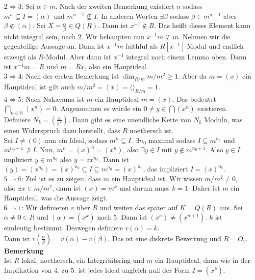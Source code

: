 \documentclass[a4paper, 12pt]{article}
\begin{document}
$2 \Rightarrow 3$: Sei $\alpha \in m$. Nach der zweiten Bemerkung existiert $n$ sodass $m^n \subseteq I = (\alpha)$ und $m^{n-1} \not \subseteq I$. In anderen Worten $\exists \beta$ sodass $\beta \in m^{n-1}$ aber $\beta \notin (\alpha)$. Sei $X = \frac{\alpha}{\beta} \in Q(R)$. Dann ist $x^{-1} \notin R$. Das heißt dieses Element kann nicht integral sein, nach 2. Wir behaupten nun $x^{-1}m \not \subseteq m$. Nehmen wir die gegenteilige Aussage an. Dann ist $x^{-1}m$ faithful als $R[x^{-1}]$-Modul und endlich erzeugt als $R$-Modul. Aber dann ist $x^{-1}$ integral nach einem Lemma oben. Dann ist $x^{-1}m = R$ und $m = Rx$, also ein Hauptideal.\\
$3 \Rightarrow 4$: Nach der ersten Bemerkung ist $\dim_{R/m} m/m^2 \geq 1$. Aber da $m = (x)$ ein Hauptideal ist gilt auch $m/m^2 = (\overline{x}) = \langle \overline \rangle_{R/m} = 1$.\\
$4 \Rightarrow 5$: Nach Nakayama ist $m$ ein Hauptideal $m = (x)$. Das bedeutet $\bigcap_{n \in \mathbb{N}} (x^n) = 0$. Angenommen es würde ein $0 \neq y \in \bigcap (x^n)$ existieren. Definiere $N_k = (\frac{y}{x^k})$. Dann gibt es eine unendliche Kette von $N_k$ Moduln, was einen Widerspruch dazu herstellt, dass $R$ noethersch ist.\\
Sei $I \neq (0)$ nun ein Ideal, sodass $m^n \subseteq I$. $\exists n_0$ maximal sodass $I \subseteq m^{n_0}$ und $m^{n_0+1} \not \supseteq I$. Nun, $m^n = (x)^n = (x^n)$, also $\exists y \in I$ mit $y \notin m^{n_0+1}$. Also $y \in I$ impliziert $y \in m^{n_0}$ also $y = zx^{n_0}$. Dann ist $(y) = (x^{n_0}) = (x)^{n_0} \subseteq I \subseteq m^{n_0} = (x)^{n_0}$, das impliziert $I = (x)^{n_0}$.\\
$5 \Rightarrow 6$: Ziel ist es zu zeigen, dass $m$ ein Hauptideal ist. Wir wissen $m/m^2 \neq 0$, also $\exists x \in m/m^2$, dann ist $(x) = m^k$ und darum muss $k= 1$. Daher ist $m$ ein Hauptideal, was die Aussage zeigt.\\
$6 \Rightarrow 1$: Wir definieren $v$ über $R$ und weiten das später auf $K = Q(R)$ aus. Sei $\alpha \neq 0 \in R$ und $(\alpha) = (x^k)$ nach 5. Dann ist $(x^n) \neq (x^{n+1})$. $k$ ist eindeutig bestimmt. Deswegen definiere $v(\alpha) = k$.\\
Dann ist $v(\frac{\alpha}{\beta}) = v(\alpha) - v(\beta)$. Das ist eine diskrete Bewertung und $R=O_v$.\\
\textbf{Bemerkung}\\
Ist $R$ lokal, noethersch, ein Integritätsring und $m$ ein Hauptideal, dann wie in der Implikation von 4. zu 5. ist jedes Ideal ungleich null der Form $I = (x^k)$. 
\end{document}
